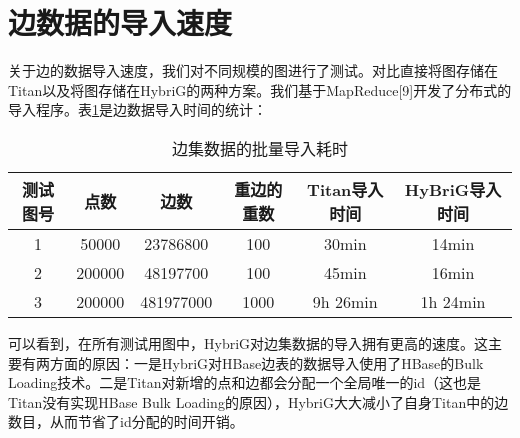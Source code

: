 \section{边数据的导入速度}
关于边的数据导入速度，我们对不同规模的图进行了测试。对比直接将图存储在Titan以及将图存储在HybriG的两种方案。我们基于MapReduce[9]开发了分布式的导入程序。表\ref{edge_load_perf}是边数据导入时间的统计：
\begin{table}[!hbp]
\begin{tabular}{|c|c|c|c|c|c|}
\hline
测试图号 & 点数 & 边数 & 重边的重数 & Titan导入时间 & HyBriG导入时间\\
\hline
1 & 50000 & 23786800 & 100 & 30min & 14min\\
\hline
2 & 200000 & 48197700 & 100 & 45min & 16min\\
\hline
3 & 200000 & 481977000 & 1000 & 9h 26min & 1h 24min\\
\hline
\end{tabular}
\caption{边集数据的批量导入耗时}
\label{edge_load_perf}
\end{table}
可以看到，在所有测试用图中，HybriG对边集数据的导入拥有更高的速度。这主要有两方面的原因：一是HybriG对HBase边表的数据导入使用了HBase的Bulk Loading技术。二是Titan对新增的点和边都会分配一个全局唯一的id（这也是Titan没有实现HBase Bulk Loading的原因），HybriG大大减小了自身Titan中的边数目，从而节省了id分配的时间开销。




